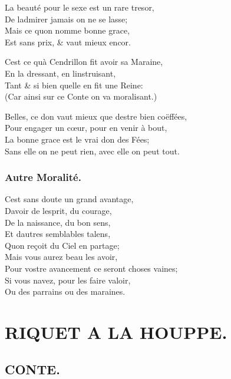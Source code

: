 \documentclass[14pt,a4paper]{memoir}
\begin{document}
\begin{otherlanguage}{french}
La beauté pour le sexe est un rare tresor, \\
De l\textquotesingle admirer jamais on ne se lasse; \\
Mais ce qu\textquotesingle on nomme bonne grace, \\
Est sans prix, \& vaut mieux encor.

C\textquotesingle est ce qu\textquotesingle à Cendrillon fit avoir sa Maraine,  \\
En la dressant, en l\textquotesingle instruisant, \\
Tant \& si bien qu\textquotesingle elle en fit une Reine: \\
(Car ainsi sur ce Conte on va moralisant.)

Belles, ce don vaut mieux que d\textquotesingle estre bien coëffées, \\
Pour engager un cœur, pour en venir à bout,  \\
La bonne grace est le vrai don des Fées; \\
Sans elle on ne peut rien, avec elle on peut tout.

\subsection{Autre Moralité.}

C\textquotesingle est sans doute un grand avantage, \\
D\textquotesingle avoir de l\textquotesingle esprit, du courage, \\
De la naissance, du bon sens, \\
Et d\textquotesingle autres semblables talens, \\
Qu\textquotesingle on reçoit du Ciel en partage; \\
Mais vous aurez beau les avoir, \\
Pour vostre avancement ce seront choses vaines;  \\
Si vous n\textquotesingle avez, pour les faire valoir, \\
Ou des parrains ou des maraines.

\chapter{RIQUET A LA HOUPPE.}

\section{CONTE.}


\end{otherlanguage}
\end{document}
